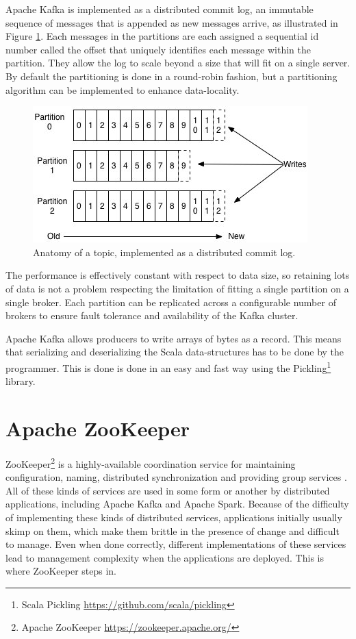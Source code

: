 Apache Kafka is implemented as a distributed commit log, an immutable sequence of messages that is appended as new messages arrive, as illustrated in Figure \ref{fig:kafkalog}. Each messages in the partitions are each assigned a sequential id number called the offset that uniquely identifies each message within the partition. They allow the log to scale beyond a size that will fit on a single server. By default the partitioning is done in a round-robin fashion, but a partitioning algorithm can be implemented to enhance data-locality. 

\begin{figure}[ht!]
\centering
\includegraphics[width=.9\textwidth]{figures/kafkalog.jpg}
\caption{Anatomy of a topic, implemented as a distributed commit log\label{fig:kafkalog}.}
\end{figure}

The performance is effectively constant with respect to data size, so retaining lots of data is not a problem respecting the limitation of fitting a single partition on a single broker. Each partition can be replicated across a configurable number of brokers to ensure fault tolerance and availability of the Kafka cluster.

Apache Kafka allows producers to write arrays of bytes as a record. This means that serializing and deserializing the Scala data-structures has to be done by the programmer. This is done is done in an easy and fast way using the Pickling\footnote{Scala Pickling \url{https://github.com/scala/pickling}} library. 

\section{Apache ZooKeeper \label{subsec_ZooKeeper}}

ZooKeeper\footnote{Apache ZooKeeper \url{https://zookeeper.apache.org/}} is a highly-available coordination service for maintaining configuration, naming, distributed synchronization and providing group services \cite{Hunt:2010}. All of these kinds of services are used in some form or another by distributed applications, including Apache Kafka and Apache Spark. Because of the difficulty of implementing these kinds of distributed services, applications initially usually skimp on them, which make them brittle in the presence of change and difficult to manage. Even when done correctly, different implementations of these services lead to management complexity when the applications are deployed. This is where ZooKeeper steps in.

